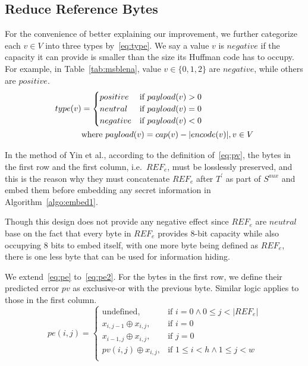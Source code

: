 \subsection{Reduce Reference Bytes}
\label{sec:improveref}

For the convenience of better explaining our improvement, we further categorize each $v \in V$ into three types by~\eqref{eq:type}. 
We say a value $v$ is $negative$ if the capacity it can provide is smaller than the size its Huffman code has to occupy. 
For example, in Table~\ref{tab:msblena}, value $ v \in \{0, 1, 2\}$ are $negative$, while others are $positive$.
\begin{align}
	\label{eq:type}
	type(v) & = 
	\begin{cases}
		positive & \text{if } payload(v) > 0 \\
		neutral  & \text{if } payload(v) = 0 \\
		negative & \text{if } payload(v) < 0 \\
	\end{cases} \\
	& \text{where } payload(v) = cap(v) - |encode(v)|, v \in V \notag
\end{align}

In the method of Yin et al., according to the definition of~\eqref{eq:pv}, the bytes in the first row and the first column, i.e.\ $REF_e$, must be losslessly preserved, and this is the reason why they must concatenate $REF_e$ after $T^\prime$ as part of $S^{aux}$ and embed them before embedding any secret information in Algorithm~\ref{algo:embed1}. 

Though this design does not provide any negative effect since $REF_e$ are $neutral$ base on the fact that every byte in $REF_e$ provides 8-bit capacity while also occupying 8 bits to embed itself, with one more byte being defined as $REF_e$, there is one less byte that can be used for information hiding. 

We extend~\eqref{eq:pe} to~\eqref{eq:pe2}. 
For the bytes in the first row, we define their predicted error $pv$ as exclusive-or with the previous byte. 
Similar logic applies to those in the first column. 
\begin{equation}
	\label{eq:pe2}
	pe(i, j) = 
	\begin{cases}
		\text{undefined},             & \text{if } i = 0 \wedge  0 \leq j < |REF_e| \\
		x_{i, j - 1} \oplus x_{i, j}, & \text{if } i = 0 \\
		x_{i - 1, j} \oplus x_{i, j}, & \text{if } j = 0 \\
		pv(i, j) \oplus x_{i, j}, 	  & \text{if } 1 \leq i < h \wedge 1 \leq j < w \\
	\end{cases} 
\end{equation}



